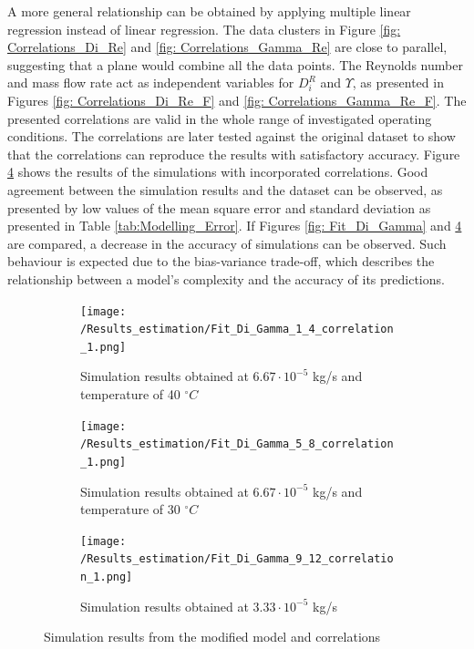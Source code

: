 \documentclass[a4paper,fleqn]{cas-dc}
\begin{document}
A more general relationship can be obtained by applying multiple linear regression instead of linear regression. The data clusters in Figure \ref{fig: Correlations_Di_Re} and \ref{fig: Correlations_Gamma_Re} are close to parallel, suggesting that a plane would combine all the data points. The Reynolds number and mass flow rate act as independent variables for $D_i^R$ and $\Upsilon$, as presented in Figures \ref{fig: Correlations_Di_Re_F} and \ref{fig: Correlations_Gamma_Re_F}. The presented correlations are valid in the whole range of investigated operating conditions. The correlations are later tested against the original dataset to show that the correlations can reproduce the results with satisfactory accuracy. Figure \ref{fig: Fit_Di_Gamma_correlation} shows the results of the simulations with incorporated correlations. Good agreement between the simulation results and the dataset can be observed, as presented by low values of the mean square error and standard deviation as presented in Table \ref{tab:Modelling_Error}. If Figures \ref{fig: Fit_Di_Gamma} and \ref{fig: Fit_Di_Gamma_correlation} are compared, a decrease in the accuracy of simulations can be observed. Such behaviour is expected due to the bias-variance trade-off, which describes the relationship between a model's complexity and the accuracy of its predictions.

\begin{figure}[!h]
	\centering
	\begin{subfigure}{0.92\columnwidth}
		\centering
		\texttt{[image: /Results\_estimation/Fit\_Di\_Gamma\_1\_4\_correlation\_1.png]}
		\caption{Simulation results obtained at $6.67\cdot 10^{-5}$ kg/s and temperature of 40 $^\circ C$}
		\label{fig: Fit_1_4_Di_Gamma_correlation}
	\end{subfigure}
	\hfill
	\begin{subfigure}{0.92\columnwidth}
		\centering
		\texttt{[image: /Results\_estimation/Fit\_Di\_Gamma\_5\_8\_correlation\_1.png]}
		\caption{Simulation results obtained at $6.67\cdot 10^{-5}$ kg/s and temperature of 30 $^\circ C$}
		\label{fig: Fit_5_8_Di_Gamma_correlation}
	\end{subfigure}
	\hfill
	\begin{subfigure}{0.92\columnwidth}
		\centering
		\texttt{[image: /Results\_estimation/Fit\_Di\_Gamma\_9\_12\_correlation\_1.png]}
		\caption{Simulation results obtained at $3.33 \cdot 10^{-5}$ kg/s}
		\label{fig: Fit_9_12_Di_Gamma_correlation}
	\end{subfigure}
	\caption{Simulation results from the modified model and correlations}
	\label{fig: Fit_Di_Gamma_correlation}
\end{figure}
\end{document}
